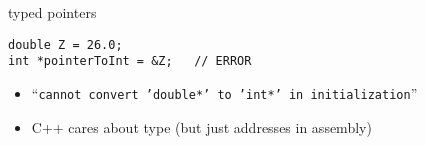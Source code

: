 \begin{frame}[fragile,label=typedPointer]{typed pointers}
\lstset{
    language=C++,
    style=small
}
\begin{lstlisting}
double Z = 26.0;
int *pointerToInt = &Z;   // ERROR
\end{lstlisting}
\begin{itemize}
\item ``\texttt{cannot convert 'double*' to 'int*' in initialization}''
\item C++ cares about type (but just addresses in assembly)
\end{itemize}
\end{frame}
